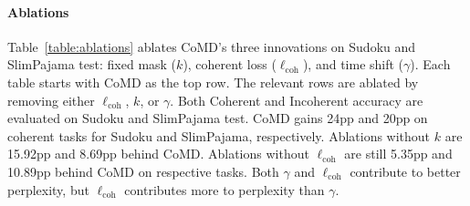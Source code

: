 \paragraph{Ablations}
Table~\ref{table:ablations} ablates CoMD's three innovations on Sudoku and SlimPajama test: fixed mask ($k$), coherent loss ($\ell_\mathrm{coh}$), and time shift ($\gamma$). Each table starts with CoMD as the top row. The relevant rows are ablated by removing either $\ell_\mathrm{coh}$, $k$, or $\gamma$. Both Coherent and Incoherent accuracy are evaluated on Sudoku and SlimPajama test. CoMD gains 24pp and 20pp on coherent tasks for Sudoku and SlimPajama, respectively. Ablations without $k$ are 15.92pp and 8.69pp behind CoMD. Ablations without $\ell_\mathrm{coh}$ are still 5.35pp and 10.89pp behind CoMD on respective tasks. Both $\gamma$ and $\ell_\mathrm{coh}$ contribute to better perplexity, but $\ell_\mathrm{coh}$ contributes more to perplexity than $\gamma$. 

